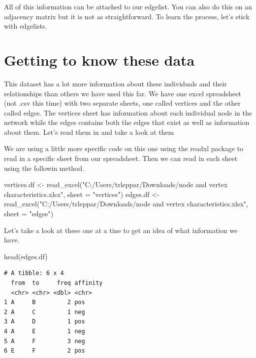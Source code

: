 \documentclass[
  letterpaper,
  DIV=11,
  numbers=noendperiod]{scrreprt}
\newenvironment{Shaded}{\begin{snugshade}}{\end{snugshade}}
\newcommand{\AttributeTok}[1]{\textcolor[rgb]{0.40,0.45,0.13}{#1}}
\newcommand{\FunctionTok}[1]{\textcolor[rgb]{0.28,0.35,0.67}{#1}}
\newcommand{\NormalTok}[1]{\textcolor[rgb]{0.00,0.23,0.31}{#1}}
\newcommand{\OtherTok}[1]{\textcolor[rgb]{0.00,0.23,0.31}{#1}}
\newcommand{\StringTok}[1]{\textcolor[rgb]{0.13,0.47,0.30}{#1}}
\begin{document}
All of this information can be attached to our edgelist. You can also do
this on an adjacency matrix but it is not as straightforward. To learn
the process, let's stick with edgelists.

\section{Getting to know these data}\label{getting-to-know-these-data}

This dataset has a lot more information about these individuals and
their relationships than others we have used this far. We have one excel
spreadsheet (not .csv this time) with two separate sheets, one called
vertices and the other called edges. The vertices sheet has information
about each individual node in the network while the edges contains both
the edges that exist as well as information about them. Let's read them
in and take a look at them

We are using a little more specific code on this one using the readxl
package to read in a specific sheet from our spreadsheet. Then we can
read in each sheet using the followin method.

\begin{Shaded}
\begin{Highlighting}[]
\NormalTok{vertices.df }\OtherTok{\textless{}{-}} \FunctionTok{read\_excel}\NormalTok{(}\StringTok{"C:/Users/trleppar/Downloads/node and vertex characteristics.xlsx"}\NormalTok{, }\AttributeTok{sheet =} \StringTok{"vertices"}\NormalTok{)}
\NormalTok{edges.df }\OtherTok{\textless{}{-}} \FunctionTok{read\_excel}\NormalTok{(}\StringTok{"C:/Users/trleppar/Downloads/node and vertex characteristics.xlsx"}\NormalTok{, }\AttributeTok{sheet =} \StringTok{"edges"}\NormalTok{)}
\end{Highlighting}
\end{Shaded}

Let's take a look at these one at a tine to get an idea of what
information we have.

\begin{Shaded}
\begin{Highlighting}[]
\FunctionTok{head}\NormalTok{(edges.df)}
\end{Highlighting}
\end{Shaded}

\begin{verbatim}
# A tibble: 6 x 4
  from  to     freq affinity
  <chr> <chr> <dbl> <chr>   
1 A     B         2 pos     
2 A     C         1 neg     
3 A     D         1 pos     
4 A     E         1 neg     
5 A     F         3 neg     
6 E     F         2 pos     
\end{verbatim}
\end{document}
